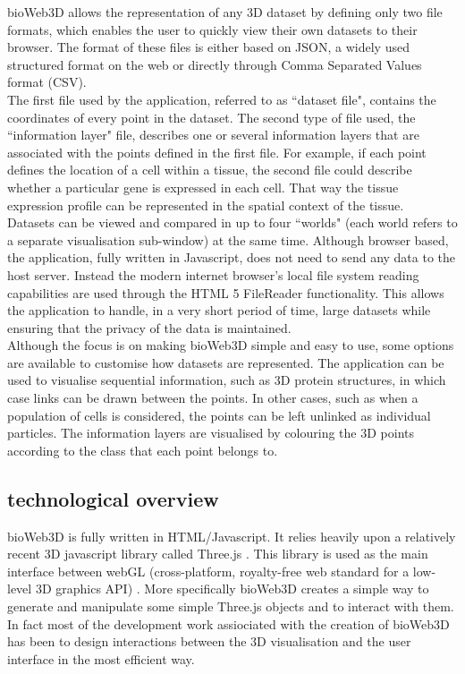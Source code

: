 \documentclass[10pt]{bmc_article}
\newenvironment{bmcformat}{\baselineskip20pt\sloppy\setboolean{publ}{false}}{\baselineskip20pt\sloppy}
\begin{document}
\begin{bmcformat}
bioWeb3D allows the representation of any 3D dataset by defining only two file formats, which enables the user to quickly view their own datasets to their browser. The format of these files is either based on JSON, a widely used structured format on the web \cite{Wilde07} or directly through Comma Separated Values format (CSV).\\
The first file used by the application, referred to as ``dataset file", contains the coordinates of every point in the dataset. The second type of file used, the ``information layer" file, describes one or several information layers that are associated with the points defined in the first file. For example, if each point defines the location of a cell within a tissue, the second file could describe whether a particular gene is expressed in each cell. That way the tissue expression profile can be represented in the spatial context of the tissue.\\
Datasets can be viewed and compared in up to four ``worlds" (each world refers to a separate visualisation sub-window) at the same time. Although browser based, the application, fully written in Javascript, does not need to send any data to the host server. Instead the modern internet browser's local file system reading capabilities are used through the HTML 5 FileReader functionality. This allows the application to handle, in a very short period of time, large datasets while ensuring that the privacy of the data is maintained.\\
Although the focus is on making bioWeb3D simple and easy to use, some options are available to customise how datasets are represented. The application can be used to visualise sequential information, such as 3D protein structures, in which case links can be drawn between the points. In other cases, such as when a population of cells is considered, the points can be left unlinked as individual particles. The information layers are visualised by colouring the 3D points according to the class that each point belongs to.
\subsection{technological overview}
bioWeb3D is fully written in HTML/Javascript. It relies heavily upon a relatively recent 3D javascript library called Three.js \cite{three}. This library is used as the main interface between webGL (cross-platform, royalty-free web standard for a low-level 3D graphics API) \cite{webgl}. More specifically bioWeb3D creates a simple way to generate and manipulate some simple Three.js objects and to interact with them. In fact most of the development work assiociated with the creation of bioWeb3D has been to design interactions between the 3D visualisation and the user interface in the most efficient way.\\

\end{bmcformat}
\end{document}
